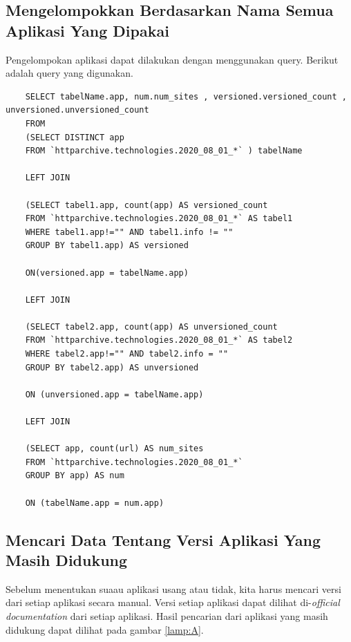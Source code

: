 \subsection{Mengelompokkan Berdasarkan Nama Semua Aplikasi Yang Dipakai}
Pengelompokan aplikasi dapat dilakukan dengan menggunakan query. Berikut adalah query yang digunakan.
\begin{lstlisting}
	SELECT tabelName.app, num.num_sites , versioned.versioned_count , unversioned.unversioned_count
	FROM 
	(SELECT DISTINCT app
	FROM `httparchive.technologies.2020_08_01_*` ) tabelName
	
	LEFT JOIN 
	
	(SELECT tabel1.app, count(app) AS versioned_count
	FROM `httparchive.technologies.2020_08_01_*` AS tabel1
	WHERE tabel1.app!="" AND tabel1.info != "" 
	GROUP BY tabel1.app) AS versioned
	
	ON(versioned.app = tabelName.app)
	
	LEFT JOIN
	
	(SELECT tabel2.app, count(app) AS unversioned_count
	FROM `httparchive.technologies.2020_08_01_*` AS tabel2
	WHERE tabel2.app!="" AND tabel2.info = "" 
	GROUP BY tabel2.app) AS unversioned
	
	ON (unversioned.app = tabelName.app)
	
	LEFT JOIN 
	
	(SELECT app, count(url) AS num_sites
	FROM `httparchive.technologies.2020_08_01_*`
	GROUP BY app) AS num
	
	ON (tabelName.app = num.app)
\end{lstlisting}

\subsection{Mencari Data Tentang Versi Aplikasi Yang Masih Didukung}
Sebelum menentukan suaau aplikasi usang atau tidak, kita harus mencari versi dari setiap aplikasi secara manual. Versi setiap aplikasi dapat dilihat di-\textit{official documentation} dari setiap aplikasi. Hasil pencarian dari aplikasi yang masih didukung dapat dilihat pada gambar \ref{lamp:A}. 

